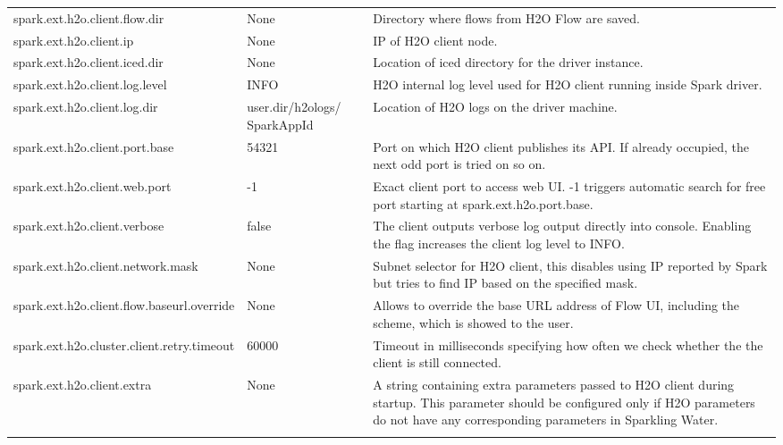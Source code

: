 \documentclass{standalone}
\begin{document}
\begin{footnotesize}
\begin{longtable}[!ht]{l p{2.0cm} p{3.0cm}}
			spark.ext.h2o.client.flow.dir & None & Directory where flows from H2O Flow are saved. \\ \addlinespace

			spark.ext.h2o.client.ip & None & IP of H2O client node. \\ \addlinespace

			spark.ext.h2o.client.iced.dir & None & Location of iced directory for the driver instance. \\ \addlinespace

			spark.ext.h2o.client.log.level & INFO & H2O internal log level used for H2O client running inside Spark driver. \\  \addlinespace

			spark.ext.h2o.client.log.dir & {user.dir}/h2ologs/ {SparkAppId} & Location of H2O logs on the driver machine. \\  \addlinespace

			spark.ext.h2o.client.port.base & 54321 & Port on which H2O client publishes its API. If already occupied, the next odd port is tried on so on. \\ \addlinespace

			spark.ext.h2o.client.web.port & -1 & Exact client port to access web UI. -1 triggers automatic search for free port starting at spark.ext.h2o.port.base.\\ \addlinespace

			spark.ext.h2o.client.verbose & false & The client outputs verbose log output directly into console. Enabling the flag increases the client log level to INFO. \\ \addlinespace

			spark.ext.h2o.client.network.mask & None & Subnet selector for H2O client, this disables using IP reported by Spark but tries to find IP based on the specified mask. \\ \addlinespace

			spark.ext.h2o.client.flow.baseurl.override & None & Allows to override the base URL address of Flow UI, including the scheme, which is showed to the user. \\ \addlinespace

			spark.ext.h2o.cluster.client.retry.timeout & 60000 & Timeout in milliseconds specifying how often we check whether the the client is still connected. \\ \addlinespace

			spark.ext.h2o.client.extra & None & A string containing extra parameters passed to H2O client during startup. This parameter should be configured only if H2O parameters do not have any corresponding parameters in Sparkling Water. \\ \addlinespace


\end{longtable}
\end{footnotesize}
\end{document}
